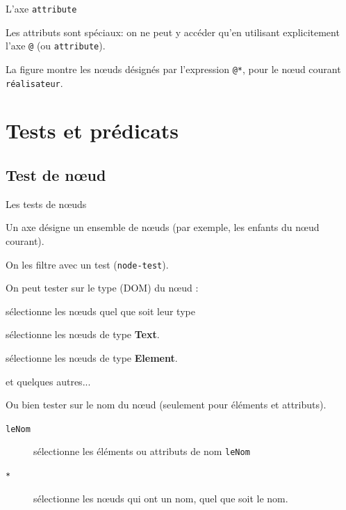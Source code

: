 \begin{frame}{L'axe \texttt{attribute}}

Les attributs sont spéciaux: on ne peut y accéder qu'en utilisant explicitement l'axe \texttt{@}
(ou \texttt{attribute}).

\vfill

La figure montre les nœuds désignés par l'expression \texttt{@*}, pour le
nœud courant \texttt{réalisateur}.


\end{frame}

\section{Tests et prédicats}


\subsection{Test de nœud}

\begin{frame}{Les tests de nœuds}

Un axe désigne un ensemble de nœuds (par exemple, les enfants du nœud courant).

\vfill

On les \alert{filtre} avec un test (\texttt{node-test}). 

\vfill

On peut tester sur le type (DOM) du nœud :
\begin{description}
\item[\texttt{node()}] sélectionne les nœuds  quel que soit leur type
\item[\texttt{text()}] sélectionne les nœuds de type \textbf{Text}.
\item[\texttt{element()}] sélectionne les nœuds de type \textbf{Element}.
\item et quelques autres...
\end{description}

\medskip

Ou bien tester sur le nom du nœud (seulement pour éléments et attributs).

\begin{description}
\item[\texttt{leNom}] sélectionne les éléments ou attributs de nom \texttt{leNom}
\item[\texttt{*}] sélectionne les nœuds qui ont un nom, quel que soit le nom.
\end{description}

\end{frame}

